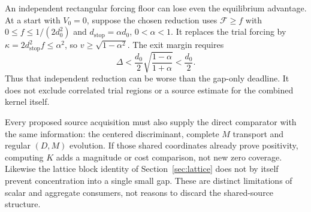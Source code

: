 An independent rectangular forcing floor can lose even the equilibrium
advantage. At a start with $V_0=0$, suppose the chosen reduction uses
$\mathcal F\ge f$ with $0\le f\le1/(2d_0^2)$ and
$d_{\mathrm{stop}}=\alpha d_0$, $0<\alpha<1$. It replaces the trial
forcing by $\kappa=2d_{\mathrm{stop}}^2f\le\alpha^2$, so
$v\ge\sqrt{1-\alpha^2}$. The exit margin requires
\begin{equation}
 \Delta<\frac{d_0}{2}\sqrt{\frac{1-\alpha}{1+\alpha}}<\frac{d_0}{2}.
 \label{cmp:rectangular-screen}
\end{equation}
Thus that independent reduction can be worse than the gap-only deadline.
It does not exclude correlated trial regions or a source estimate for
the combined kernel itself.

Every proposed source acquisition must also supply the direct comparator
with the same information: the centered discriminant, complete $M$
transport and regular $(D,M)$ evolution. If those shared coordinates
already prove positivity, computing $K$ adds a magnitude or cost
comparison, not new zero coverage. Likewise the lattice block identity
of Section~\ref{sec:lattice} does not by itself prevent concentration
into a single small gap. These are distinct limitations of scalar and
aggregate consumers, not reasons to discard the shared-source structure.
